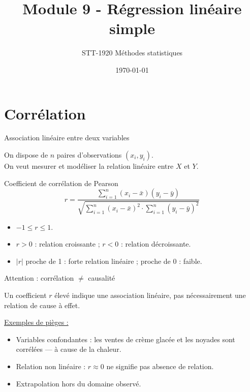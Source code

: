 \documentclass{BeamerTemplate}
\title{Module 9 - Régression linéaire simple}
\subtitle{STT-1920 Méthodes statistiques}
\date{\today}
\begin{document}
\begin{frame}[t]
  \titlepage
\end{frame}

\section{Corrélation}

\begin{frame}[t]{Association linéaire entre deux variables}

On dispose de $n$ paires d'observations $(x_i, y_i)$.\\
On veut mesurer et modéliser la \alert{relation linéaire} entre $X$ et $Y$.

\bigskip
\begin{Boite}{Coefficient de corrélation de Pearson}
$$r = \frac{\displaystyle\sum_{i=1}^n (x_i-\bar{x})(y_i-\bar{y})}{\sqrt{\displaystyle\sum_{i=1}^n(x_i-\bar{x})^2 \cdot \sum_{i=1}^n(y_i-\bar{y})^2}}$$
\end{Boite}

\medskip
\begin{itemize}\itemsep3mm
  \item $-1 \le r \le 1$.
  \item $r > 0$ : relation croissante ; $r < 0$ : relation décroissante.
  \item $|r|$ proche de 1 : forte relation linéaire ; proche de 0 : faible.
\end{itemize}

\end{frame}

\begin{frame}[t]{Attention : corrélation $\neq$ causalité}

Un coefficient $r$ élevé indique une \alert{association} linéaire, pas nécessairement une relation de cause à effet.

\bigskip
\underline{Exemples de pièges :}
\begin{itemize}\itemsep5mm
  \item Variables confondantes : les ventes de crème glacée et les noyades sont corrélées — à cause de la chaleur.
  \item Relation non linéaire : $r \approx 0$ ne signifie pas absence de relation.
  \item Extrapolation hors du domaine observé.
\end{itemize}

\end{frame}
\end{document}
